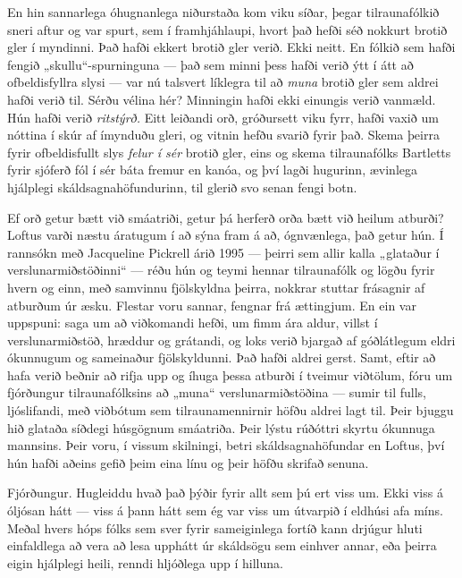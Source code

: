 En hin sannarlega óhugnanlega niðurstaða kom viku síðar, þegar tilraunafólkið sneri aftur og var spurt, sem í framhjáhlaupi, hvort það hefði séð nokkurt brotið gler í myndinni. Það hafði ekkert brotið gler verið. Ekki neitt. En fólkið sem hafði fengið „skullu“-spurninguna — það sem minni þess hafði verið ýtt í átt að ofbeldisfyllra slysi — var nú talsvert líklegra til að \emph{muna} brotið gler sem aldrei hafði verið til. Sérðu vélina hér? Minningin hafði ekki einungis verið vanmæld. Hún hafði verið \emph{ritstýrð.} Eitt leiðandi orð, gróðursett viku fyrr, hafði vaxið um nóttina í skúr af ímynduðu gleri, og vitnin hefðu svarið fyrir það. Skema þeirra fyrir ofbeldisfullt slys \emph{felur í sér} brotið gler, eins og skema tilraunafólks Bartletts fyrir sjóferð fól í sér báta fremur en kanóa, og því lagði hugurinn, ævinlega hjálplegi skáldsagnahöfundurinn, til glerið svo senan fengi botn.

Ef orð getur bætt við smáatriði, getur þá herferð orða bætt við heilum atburði? Loftus varði næstu áratugum í að sýna fram á að, ógnvænlega, það getur hún. Í rannsókn með Jacqueline Pickrell árið 1995 — þeirri sem allir kalla „glataður í verslunarmiðstöðinni“ — réðu hún og teymi hennar tilraunafólk og lögðu fyrir hvern og einn, með samvinnu fjölskyldna þeirra, nokkrar stuttar frásagnir af atburðum úr æsku. Flestar voru sannar, fengnar frá ættingjum. En ein var uppspuni: saga um að viðkomandi hefði, um fimm ára aldur, villst í verslunarmiðstöð, hræddur og grátandi, og loks verið bjargað af góðlátlegum eldri ókunnugum og sameinaður fjölskyldunni. Það hafði aldrei gerst. Samt, eftir að hafa verið beðnir að rifja upp og íhuga þessa atburði í tveimur viðtölum, fóru um fjórðungur tilraunafólksins að „muna“ verslunarmiðstöðina — sumir til fulls, ljóslifandi, með viðbótum sem tilraunamennirnir höfðu aldrei lagt til. Þeir bjuggu hið glataða síðdegi húsgögnum smáatriða. Þeir lýstu rúðóttri skyrtu ókunnuga mannsins. Þeir voru, í vissum skilningi, betri skáldsagnahöfundar en Loftus, því hún hafði aðeins gefið þeim eina línu og þeir höfðu skrifað senuna.

Fjórðungur. Hugleiddu hvað það þýðir fyrir allt sem þú ert viss um. Ekki viss á óljósan hátt — viss á þann hátt sem ég var viss um útvarpið í eldhúsi afa míns. Meðal hvers hóps fólks sem sver fyrir sameiginlega fortíð kann drjúgur hluti einfaldlega að vera að lesa upphátt úr skáldsögu sem einhver annar, eða þeirra eigin hjálplegi heili, renndi hljóðlega upp í hilluna.

